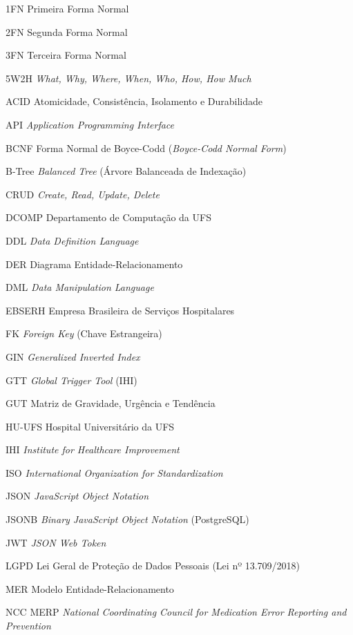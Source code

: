 \begin{siglas}
    \item[1FN] Primeira Forma Normal
    \item[2FN] Segunda Forma Normal
    \item[3FN] Terceira Forma Normal
    \item[5W2H] \textit{What, Why, Where, When, Who, How, How Much}
    \item[ACID] Atomicidade, Consistência, Isolamento e Durabilidade
    \item[API] \textit{Application Programming Interface}
    \item[BCNF] Forma Normal de Boyce-Codd (\textit{Boyce-Codd Normal Form})
    \item[B-Tree] \textit{Balanced Tree} (Árvore Balanceada de Indexação)
    \item[CRUD] \textit{Create, Read, Update, Delete}
    \item[DCOMP] Departamento de Computação da UFS
    \item[DDL] \textit{Data Definition Language}
    \item[DER] Diagrama Entidade-Relacionamento
    \item[DML] \textit{Data Manipulation Language}
    \item[EBSERH] Empresa Brasileira de Serviços Hospitalares
    \item[FK] \textit{Foreign Key} (Chave Estrangeira)
    \item[GIN] \textit{Generalized Inverted Index}
    \item[GTT] \textit{Global Trigger Tool} (IHI)
    \item[GUT] Matriz de Gravidade, Urgência e Tendência
    \item[HU-UFS] Hospital Universitário da UFS
    \item[IHI] \textit{Institute for Healthcare Improvement}
    \item[ISO] \textit{International Organization for Standardization}
    \item[JSON] \textit{JavaScript Object Notation}
    \item[JSONB] \textit{Binary JavaScript Object Notation} (PostgreSQL)
    \item[JWT] \textit{JSON Web Token}
    \item[LGPD] Lei Geral de Proteção de Dados Pessoais (Lei nº 13.709/2018)
    \item[MER] Modelo Entidade-Relacionamento
    \item[NCC MERP] \textit{National Coordinating Council for Medication Error Reporting and Prevention}

\end{siglas}
